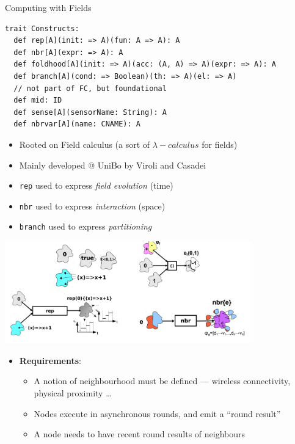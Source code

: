 \documentclass[8pt, aspectratio=169, handout]{beamer}
\begin{document}
\begin{frame}{Computing with Fields}
  \begin{card}
    \begin{verbatim}
trait Constructs:
  def rep[A](init: => A)(fun: A => A): A
  def nbr[A](expr: => A): A
  def foldhood[A](init: => A)(acc: (A, A) => A)(expr: => A): A
  def branch[A](cond: => Boolean)(th: => A)(el: => A)
  // not part of FC, but foundational
  def mid: ID
  def sense[A](sensorName: String): A
  def nbrvar[A](name: CNAME): A
    \end{verbatim}
\begin{itemize}
  \item Rooted on Field calculus (a sort of $\lambda-calculus$ for fields)
  \item Mainly developed @ UniBo by Viroli and Casadei
  \item \texttt{rep} used to express \emph{field evolution} (time)
  \item \texttt{nbr} used to express \emph{interaction} (space)
  \item \texttt{branch} used to express \emph{partitioning}
\end{itemize}
  \end{card}
\framebreak
\begin{card}
  \centering
  \includegraphics[width=0.8\textwidth]{img/high-level-examples.png}
\end{card}
\begin{card}
  \begin{itemize}
    \item \textbf{Requirements}:
    \begin{itemize}
      \item A notion of neighbourhood must be defined — wireless connectivity, physical proximity \dots
      \item Nodes execute in asynchronous rounds, and emit a ``round result''
      \item A node needs to have recent round results of neighbours

\end{itemize}
\end{itemize}
\end{card}
\end{frame}
\end{document}
